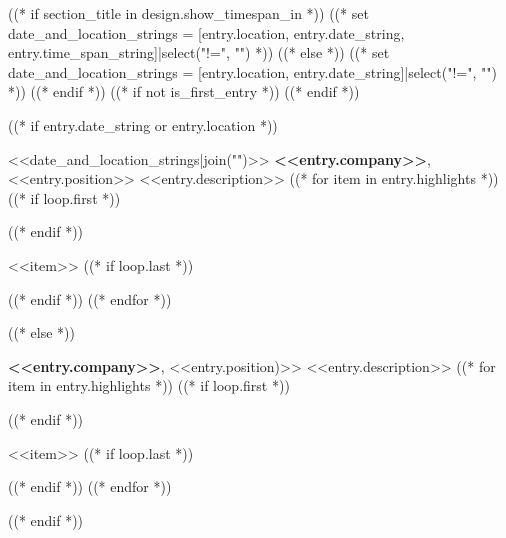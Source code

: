 ((* if section_title in design.show_timespan_in *))
    ((* set date_and_location_strings = [entry.location, entry.date_string, entry.time_span_string]|select("!=", "") *))
((* else *))
    ((* set date_and_location_strings = [entry.location, entry.date_string]|select("!=", "") *))
((* endif *))
((* if not is_first_entry *))
\vspace{<<design.margins.entry_area.vertical_between>>}
((* endif *))

((* if entry.date_string or entry.location *))
\begin{twocolentry}{
    <<date_and_location_strings|join("\n\n")>>
}
    \textbf{<<entry.company>>}, <<entry.position>> 
    \newline <<entry.description>>
    ((* for item in entry.highlights *))
        ((* if loop.first *))
    \begin{highlights}
        ((* endif *))
        \item <<item>>
        ((* if loop.last *))
    \end{highlights}
        ((* endif *))
    ((* endfor *))
\end{twocolentry}
((* else *))
\begin{onecolentry}
    \textbf{<<entry.company>>}, <<entry.position)>> 
    \newline <<entry.description>>
    ((* for item in entry.highlights *))
        ((* if loop.first *))
    \begin{highlights}
        ((* endif *))
        \item <<item>>
        ((* if loop.last *))
    \end{highlights}
        ((* endif *))
    ((* endfor *))
\end{onecolentry}
((* endif *))